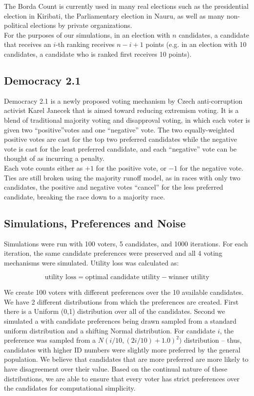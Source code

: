 \documentclass[11pt]{scrartcl}
\begin{document}
The Borda Count is currently used in many real elections such as the presidential election in Kiribati, the Parliamentary election in Nauru, as well as many non-political elections by private organizations. \\

For the purposes of our simulations, in an election with $n$ candidates, a candidate that receives an $i$-th ranking receives $n-i+ 1$ points (e.g. in an election with 10 candidates, a candidate who is ranked first receives 10 points). 

\subsection{Democracy 2.1} 

Democracy 2.1 is a newly proposed voting mechanism by Czech anti-corruption activist Karel Janecek that is aimed toward reducing extremism voting. It is a blend of traditional majority voting and disapproval voting, in which each voter is given two ``positive''votes and one ``negative'' vote. The two equally-weighted positive votes are cast for the top two preferred candidates while the negative vote is cast for the least preferred candidate, and each ``negative'' vote can be thought of as incurring a penalty.\\

Each vote counts either as $+1$ for the positive vote, or $-1$ for the negative vote. Ties are still broken using the majority runoff model, as in races with only two candidates, the positive and negative votes ``cancel'' for the less preferred candidate, breaking the race down to a majority race.

\subsection{Simulations, Preferences and Noise}

Simulations were run with 100 voters, 5 candidates, and 1000 iterations. For each iteration, the same candidate preferences were preserved and all 4 voting mechanisms were simulated. Utility loss was calculated as:

\[\textrm{utility loss} = \textrm{optimal candidate utility} - \textrm{winner utility}\]

We create 100 voters with different preferences over the 10 available candidates. We have 2 different distributions from which the preferences are created. First there is a Uniform (0,1) distribution over all of the candidates. Second we simulated a with candidate preferences being drawn sampled from a standard uniform distribution and a shifting Normal distribution. For candidate $i$, the preference was sampled from a $N(i/10, (2i/10) + 1.0)^2)$ distribution -- thus, candidates with higher ID numbers were slightly more preferred by the general population. We believe that candidates that are more preferred are more likely to have disagreement over their value. Based on the continual nature of these distributions, we are able to ensure that every voter has strict preferences over the candidates for computational simplicity.\\
\end{document}
